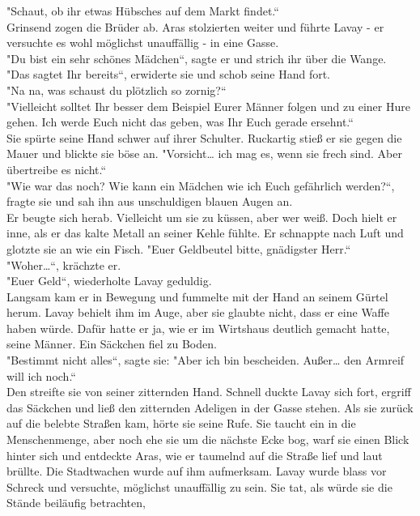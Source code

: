 "Schaut, ob ihr etwas Hübsches auf dem Markt findet.``\\
Grinsend zogen die Brüder ab. Aras stolzierten weiter und führte Lavay - er versuchte es wohl 
möglichst unauffällig - in eine Gasse.\\
"Du bist ein sehr schönes Mädchen``, sagte er und strich ihr über die Wange.\\
"Das sagtet Ihr bereits``, erwiderte sie und schob seine Hand fort.\\
"Na na, was schaust du plötzlich so zornig?``\\
"Vielleicht solltet Ihr besser dem Beispiel Eurer Männer folgen und zu einer Hure gehen. Ich werde 
Euch nicht das geben, was Ihr Euch gerade ersehnt.``\\
Sie spürte seine Hand schwer auf ihrer Schulter. Ruckartig stieß er sie gegen die Mauer und blickte 
sie böse an. "Vorsicht… ich mag es, wenn sie frech sind. Aber übertreibe es nicht.``\\
"Wie war das noch? Wie kann ein Mädchen wie ich Euch gefährlich werden?``, fragte sie und sah ihn 
aus unschuldigen blauen Augen an.\\
Er beugte sich herab. Vielleicht um sie zu küssen, aber wer weiß. Doch hielt er inne, als er das 
kalte Metall an seiner Kehle fühlte. Er schnappte nach Luft und glotzte sie an wie ein Fisch. "Euer 
Geldbeutel bitte, gnädigster Herr.``\\
"Woher…``, krächzte er.\\
"Euer Geld``, wiederholte Lavay geduldig.\\
Langsam kam er in Bewegung und fummelte mit der Hand an seinem Gürtel herum. Lavay behielt ihm im 
Auge, aber sie glaubte nicht, dass er eine Waffe haben würde. Dafür hatte er ja, wie er im 
Wirtshaus deutlich gemacht hatte, seine Männer. Ein Säckchen fiel zu Boden.\\
"Bestimmt nicht alles``, sagte sie: "Aber ich bin bescheiden. Außer… den Armreif will ich noch.``\\
Den streifte sie von seiner zitternden Hand. Schnell duckte Lavay sich fort, ergriff das Säckchen 
und ließ den zitternden Adeligen in der Gasse stehen. Als sie zurück auf die belebte Straßen kam, 
hörte sie seine Rufe. Sie taucht ein in die Menschenmenge, aber noch ehe sie um die nächste Ecke 
bog, warf sie einen Blick hinter sich und entdeckte Aras, wie er taumelnd auf die Straße lief und 
laut brüllte. Die Stadtwachen wurde auf ihm aufmerksam. Lavay wurde blass vor Schreck und 
versuchte, möglichst unauffällig zu sein. Sie tat, als würde sie die Stände beiläufig betrachten, 
